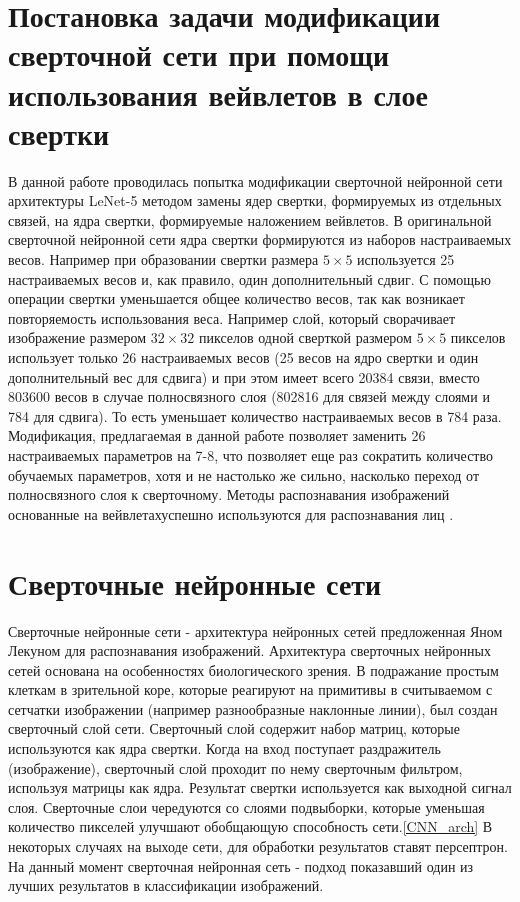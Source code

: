 \documentclass[utf8,usehyperref,14pt]{G7-32}
\begin{document}
\section{Постановка задачи модификации сверточной сети при помощи использования вейвлетов в слое свертки}
В данной работе проводилась попытка модификации сверточной нейронной сети архитектуры LeNet-5 методом замены ядер свертки, формируемых из отдельных связей, на ядра свертки, формируемые наложением вейвлетов. В оригинальной сверточной нейронной сети ядра свертки формируются из наборов настраиваемых весов. Например при образовании свертки размера $ 5 \times 5 $ используется 25 настраиваемых весов и, как правило, один дополнительный сдвиг. С помощью операции свертки уменьшается общее количество весов, так как возникает повторяемость использования веса. Например слой, который сворачивает изображение размером $ 32 \times 32 $ пикселов одной сверткой размером $ 5 \times 5 $ пикселов использует только 26 настраиваемых весов (25 весов на ядро свертки и один дополнительный вес для сдвига) и при этом имеет всего 20384 связи, вместо 803600 весов в случае полносвязного слоя (802816 для связей между слоями и 784 для сдвига). То есть уменьшает количество настраиваемых весов в 784 раза. Модификация, предлагаемая в данной работе позволяет заменить 26 настраиваемых параметров на 7-8, что позволяет еще раз сократить количество обучаемых параметров, хотя и не настолько же сильно, насколько переход от полносвязного слоя к сверточному. Методы распознавания изображений основанные на вейвлетахуспешно используются для распознавания лиц \cite{ViolaJones, YEF}.
\section{Сверточные нейронные сети}
Сверточные нейронные сети - архитектура нейронных сетей предложенная Яном Лекуном для распознавания изображений. Архитектура сверточных нейронных сетей основана на особенностях биологического зрения. В подражание простым клеткам в зрительной коре, которые реагируют на примитивы в считываемом с сетчатки изображении (например разнообразные наклонные линии), был создан сверточный слой сети. Сверточный слой содержит набор матриц, которые используются как ядра свертки. Когда на вход поступает раздражитель (изображение), сверточный слой проходит по нему сверточным фильтром, используя матрицы как ядра. Результат свертки используется как выходной сигнал слоя. Сверточные слои чередуются со слоями подвыборки, которые уменьшая количество пикселей улучшают обобщающую способность сети.\ref{CNN_arch} В некоторых случаях на выходе сети, для обработки результатов ставят персептрон. На данный момент сверточная нейронная сеть - подход показавший один из лучших результатов в классификации изображений.
\end{document}
